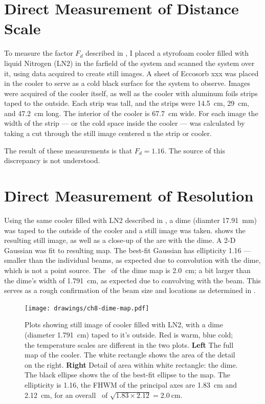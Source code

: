 \section{Direct Measurement of Distance Scale} \label{sec:ch8-dist-scale}

To measure the factor $F_d$ described in , I placed a styrofoam cooler filled with liquid Nitrogen (LN2) in the farfield of the system and scanned the system over it, using data acquired to create still images.
A sheet of Eccosorb xxx was placed in the cooler to serve as a cold black surface for the system to observe.
Images were acquired of the cooler itself, as well as the cooler with aluminum foils strips taped to the outside.
Each strip was  tall, and the strips were \SI{14.5}{\cm}, \SI{29}{\cm}, and \SI{47.2}{\cm} long.
The interior of the cooler is \SI{67.7}{\cm} wide.
For each image the \FWHM width of the strip --- or the cold space inside the cooler --- was calculated by taking a cut through the still image centered n the strip or cooler.

The result of these measurements is that $F_d = 1.16$.
The source of this discrepancy is not understood.



\section{Direct Measurement of Resolution}

Using the same cooler filled with LN2 described in , a dime (diamter \SI{17.91}{\mm}) was taped to the outside of the cooler and a still image was taken.
 shows the resulting still image, as well as a close-up of the are with the dime.
A 2-D Gaussian was fit to resulting map.
The best-fit Gaussian has ellipticity 1.16 --- smaller than the individual beams, as expected due to convolution with the dime, which is not a point source.
The \FWHM\ of the dime map is \SI{2.0}{\cm}; a bit larger than the dime's width of \SI{1.791}{\cm}, as expected due to convolving with the beam.
This serves as a rough confirmation of the beam size and locations as determined in .

\begin{figure}[th]
\centering
\texttt{[image: drawings/ch8-dime-map.pdf]}
\caption{
  Plots showing still image of cooler filled with LN2, with a dime (diameter \SI{1.791}{\cm}) taped to it's outside.
  Red is warm, blue cold; the temperature scales are different in the two plots.
  \textbf{Left} The full map of the cooler. The white rectangle shows the area of the detail on the right.
  \textbf{Right} Detail of area within white rectangle: the dime.
  The black ellipse shows the \FWHM of the best-fit ellipse to the map. The ellipticity is \num{1.16}, the FHWM of the principal axes are \SI{1.83}{\cm} and \SI{2.12}{\cm}, for an overall \FWHM\ of $\sqrt{1.83 \times 2.12} = \SI{2.0}{\cm}$.
}
\label{fig:ch8-dime-map}
\end{figure}

